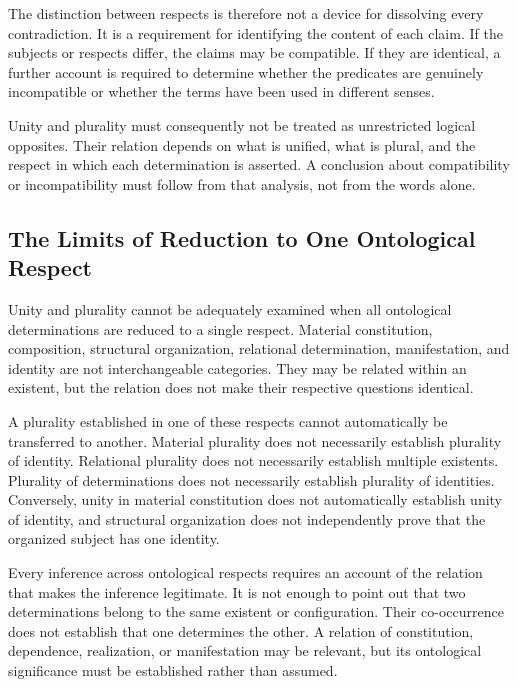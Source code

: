 The distinction between respects is therefore
not a device for dissolving every contradiction.
It is a requirement for identifying the content
of each claim. If the subjects or respects differ,
the claims may be compatible. If they are identical,
a further account is required to determine whether
the predicates are genuinely incompatible or
whether the terms have been used in different senses.

Unity and plurality must consequently not be
treated as unrestricted logical opposites. Their
relation depends on what is unified, what is plural,
and the respect in which each determination is
asserted. A conclusion about compatibility or
incompatibility must follow from that analysis,
not from the words alone.

\subsection{The Limits of Reduction to One Ontological Respect}

Unity and plurality cannot be adequately examined
when all ontological determinations are reduced
to a single respect. Material constitution,
composition, structural organization, relational
determination, manifestation, and identity are
not interchangeable categories. They may be
related within an existent, but the relation
does not make their respective questions identical.

A plurality established in one of these respects
cannot automatically be transferred to another.
Material plurality does not necessarily establish
plurality of identity. Relational plurality does
not necessarily establish multiple existents.
Plurality of determinations does not necessarily
establish plurality of identities. Conversely,
unity in material constitution does not
automatically establish unity of identity, and
structural organization does not independently
prove that the organized subject has one identity.

Every inference across ontological respects
requires an account of the relation that makes
the inference legitimate. It is not enough to
point out that two determinations belong to
the same existent or configuration. Their
co-occurrence does not establish that one
determines the other. A relation of constitution,
dependence, realization, or manifestation may
be relevant, but its ontological significance
must be established rather than assumed.

